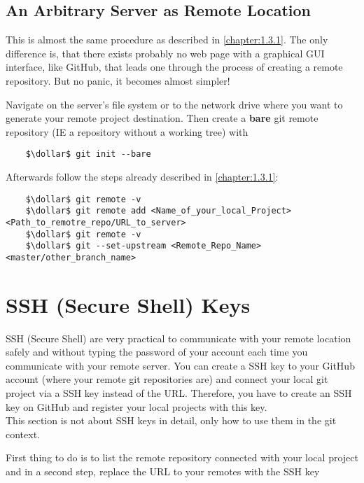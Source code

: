 \subsection{An Arbitrary Server as Remote Location}
\label{chapter:1.3.3}

This is almost the same procedure as described in \cref{chapter:1.3.1}. The only difference is, that there exists probably no web page with 
a graphical GUI interface, like GitHub, that leads one through the process of creating a remote repository. But no panic, it becomes almost simpler!


Navigate on the server's file system or to the network drive where you want to generate your remote project destination. Then create a \textbf{bare} git remote 
repository (\ac{IE} a repository without a working tree) with
\begin{lstlisting}
	$\dollar$ git init --bare
\end{lstlisting}

Afterwards follow the steps already described in \cref{chapter:1.3.1}:
\begin{lstlisting}
	$\dollar$ git remote -v
	$\dollar$ git remote add <Name_of_your_local_Project> <Path_to_remotre_repo/URL_to_server>
	$\dollar$ git remote -v
	$\dollar$ git --set-upstream <Remote_Repo_Name> <master/other_branch_name>
\end{lstlisting}


\section{SSH (Secure Shell) Keys}
\label{chapter:1.4}

SSH (Secure Shell) are very practical to communicate with your remote location safely and without typing the password of your account each time you 
communicate with your remote server. You can create a SSH key to your GitHub account (where your remote git repositories are) and connect your local git project via 
a SSH key instead of the URL. Therefore, you have to create an SSH key on GitHub and register your local projects with this key.
\\
This section is not about SSH keys in detail, only how to use them in the git context. 



First thing to do is to list the remote repository connected with your local project and in a second step, replace the URL to your remotes 
with the SSH key

